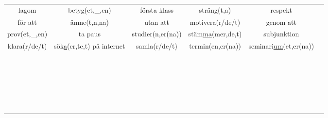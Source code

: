 
\begin{center}
    \begin{adjustwidth}{-2.4cm}{}
        \begin{tabular}{|c c c c c c|}
            \hline
            lagom & betyg(et,\_,en) & första klass & sträng(t,a) & respekt &  \\
            för att & ämne(t,n,na) & utan att & motivera(r/de/t) & genom att &  \\
            prov(et,\_,en) & ta paus & studier(n,er(na)) & stäm\underline{ma}(mer,de,t) & subjunktion &  \\
            klara(r/de/t) & sök\underline{a}(er,te,t) på internet & samla(r/de/t) & termin(en,er(na)) & seminari\underline{um}(et,er(na)) &  \\
             &  &  &  &  &  \\
             &  &  &  &  &  \\
             &  &  &  &  &  \\
             &  &  &  &  &  \\
             &  &  &  &  &  \\
             &  &  &  &  &  \\
             &  &  &  &  &  \\
             &  &  &  &  &  \\
             &  &  &  &  &  \\
             &  &  &  &  &  \\
             &  &  &  &  &  \\
             &  &  &  &  &  \\
             &  &  &  &  &  \\
             &  &  &  &  &  \\
             &  &  &  &  &  \\
             &  &  &  &  &  \\
             &  &  &  &  &  \\
             &  &  &  &  &  \\
             &  &  &  &  &  \\
             &  &  &  &  &  \\
             &  &  &  &  &  \\
             &  &  &  &  &  \\
             &  &  &  &  &  \\
             &  &  &  &  &  \\

\end{tabular}
\end{adjustwidth}
\end{center}
